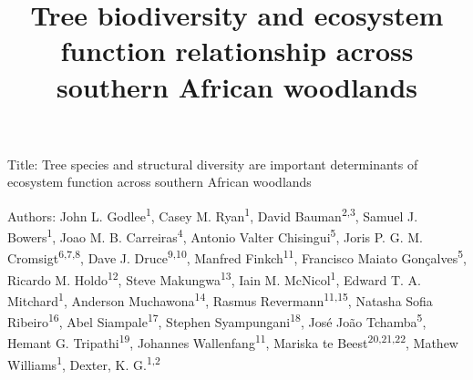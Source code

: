 \documentclass[11pt,a4paper]{article}
\title{Tree biodiversity and ecosystem function relationship across southern African woodlands}
\author{}
\date{}
\begin{document}
{\LARGE{Title: Tree species and structural diversity are important determinants of ecosystem function across southern African woodlands}}

\vspace{1cm}

Authors: John L. Godlee\textsuperscript{1}, Casey M. Ryan\textsuperscript{1}, David Bauman\textsuperscript{2,3}, Samuel J. Bowers\textsuperscript{1}, Joao M. B. Carreiras\textsuperscript{4}, Antonio Valter Chisingui\textsuperscript{5}, Joris P. G. M. Cromsigt\textsuperscript{6,7,8}, Dave J. Druce\textsuperscript{9,10}, Manfred Finkch\textsuperscript{11}, Francisco Maiato Gon\c{c}alves\textsuperscript{5}, Ricardo M. Holdo\textsuperscript{12}, Steve Makungwa\textsuperscript{13}, Iain M. McNicol\textsuperscript{1}, Edward T. A. Mitchard\textsuperscript{1}, Anderson Muchawona\textsuperscript{14}, Rasmus Revermann\textsuperscript{11,15}, Natasha Sofia Ribeiro\textsuperscript{16}, Abel Siampale\textsuperscript{17}, Stephen Syampungani\textsuperscript{18}, Jos\'{e} Jo\~{a}o Tchamba\textsuperscript{5}, Hemant G. Tripathi\textsuperscript{19}, Johannes Wallenfang\textsuperscript{11}, Mariska te Beest\textsuperscript{20,21,22}, Mathew Williams\textsuperscript{1}, Dexter, K. G.\textsuperscript{1,2}
\end{document}
